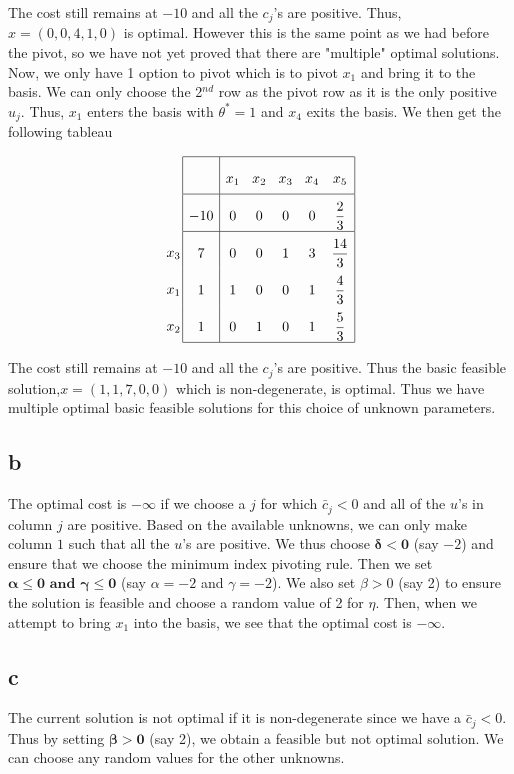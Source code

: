 The cost still remains at $-10$ and all the $c_j$'s are positive. Thus, $x = (0,0,4,1,0)$ is optimal. However this is the same point as we had before the pivot, so we have not yet proved that there are "multiple" optimal solutions. \\

Now, we only have 1 option to pivot which is to pivot $x_1$ and bring it to the basis. We can only choose the 2$^{nd}$ row as the pivot row as it is the only positive $u_j$. Thus, $x_1$ enters the basis with $\theta^* = 1$ and $x_4$ exits the basis. We then get the following tableau

$$
\arraycolsep=1.4pt\def\arraystretch{2.2}
\begin{array}{c}
\\
 \\
x_3 \\
x_1 \\ 
x_2 \\
\end{array}
\arraycolsep=4.4pt\def\arraystretch{2.2}
\begin{array}{|c|ccccc|}
    \hline
    & x_1 & x_2 & x_3 & x_4 & x_5\\ \hline 
 -10 & 0 & 0 & 0 & 0 & \dfrac{2}{3}\\ \hline
  7 & 0 & 0 & 1 & 3 & \dfrac{14}{3}\\
  1 & 1 & 0 & 0 & 1 & \dfrac{4}{3}\\
  1 & 0 & 1 & 0 & 1 & \dfrac{5}{3}\\\hline
\end{array}
$$

The cost still remains at $-10$ and all the $c_j$'s are positive. Thus the basic feasible solution,$x = (1,1,7,0,0)$ which is non-degenerate, is optimal. Thus we have multiple optimal basic feasible solutions for this choice of unknown parameters.



\subsection*{b}
The optimal cost is $- \infty$ if we choose a $j$ for which $\bar{c}_j < 0$ and all of the $u$'s in column $j$ are positive. Based on the available unknowns, we can only make column $1$ such that all the $u$'s are positive. We thus choose $\boldsymbol{\delta < 0}$ (say $-2$) and ensure that we choose the minimum index pivoting rule. Then we set $\boldsymbol{\alpha \le 0 \text{ and } \gamma \le 0}$ (say $\alpha = -2$ and $\gamma = -2$). We also set $\beta > 0 $ (say 2) to ensure the solution is feasible and choose a random value of 2 for $\eta$. Then, when we attempt to bring $x_1$ into the basis, we see that the optimal cost is $- \infty$.

\subsection*{c}
The current solution is not optimal if it is non-degenerate since we have a $\bar{c}_j < 0$. Thus by setting $\boldsymbol{\beta > 0}$ (say 2), we obtain a feasible but not optimal solution. We can choose any random values for the other unknowns.